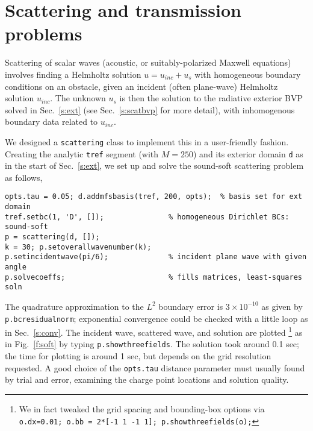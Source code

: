 \bfi %
\efi



\section{Scattering and transmission problems}
\label{s:scatt}

Scattering of scalar waves (acoustic, or suitably-polarized Maxwell
equations) involves finding a Helmholtz solution $u = u_{inc} + u_s$
with homogeneous boundary conditions
on an obstacle, given an incident (often plane-wave)
Helmholtz solution $u_{inc}$.
The unknown $u_s$ is then the solution to the radiative
exterior BVP solved in Sec.~\ref{s:ext}
(see Sec.~\ref{s:scatbvp} for more detail), with inhomogenous boundary data
related to $u_{inc}$.

We designed a {\tt scattering} class to 
implement this in a user-friendly fashion. Creating the analytic
{\tt tref} segment (with $M=250$)
and its exterior domain {\tt d} as in the start of
Sec.~\ref{s:ext}, we set up and solve the sound-soft scattering
problem as follows,
\begin{verbatim}
opts.tau = 0.05; d.addmfsbasis(tref, 200, opts);  % basis set for ext domain
tref.setbc(1, 'D', []);               % homogeneous Dirichlet BCs: sound-soft
p = scattering(d, []);
k = 30; p.setoverallwavenumber(k);
p.setincidentwave(pi/6);              % incident plane wave with given angle
p.solvecoeffs;                        % fills matrices, least-squares soln
\end{verbatim}
The quadrature approximation to the $L^2$ boundary error is $3\times10^{-10}$
as given by {\tt p.bcresidualnorm}; exponential convergence could be checked
with a little loop as in Sec.~\ref{s:conv}. 
The incident wave, scattered wave, and solution are plotted%
  \footnote{We in fact tweaked the grid spacing and bounding-box options via
{\tt o.dx=0.01; o.bb = 2*[-1 1 -1 1]; p.showthreefields(o);}}
as in Fig.~\ref{f:soft} by typing {\tt p.showthreefields}.
The solution took around 0.1 sec; the time for plotting is around 1 sec, but
depends on the grid resolution requested.
A good choice of the {\tt opts.tau} distance parameter must usually found
by trial and error, examining the charge point locations and solution quality.

